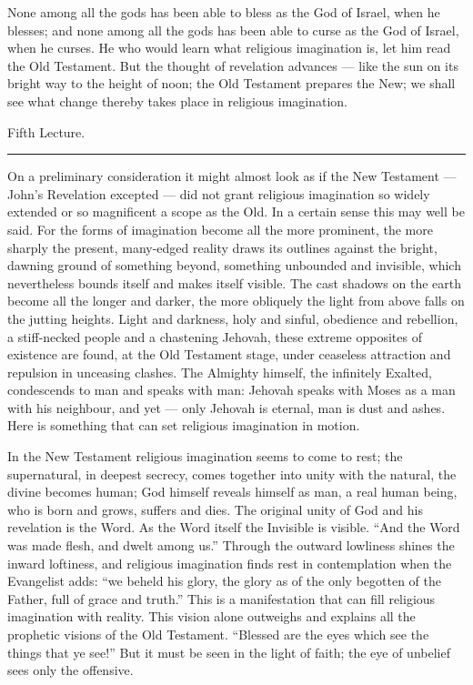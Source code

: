 \documentclass[12pt,a4paper,openany]{book}
\newcommand{\opage}[1]{\marginnote{\footnotesize\textit{[#1]}}}
\newcommand{\lecture}[1]{\clearpage\begin{center}{\large #1}\\[0.4em]\rule{3em}{0.4pt}\end{center}\medskip\noindent}
\begin{document}
None among all the gods has been able to bless as the God of Israel, when he blesses; and none among all the gods has been able to curse as the God of Israel, when he curses. He who would learn what religious imagination is, let him read the Old Testament. But the thought of revelation advances --- like the sun on its bright way to the height of noon; the Old Testament prepares the New; we shall see what change thereby takes place in religious imagination.

\setcounter{footnote}{0}%
\lecture{Fifth Lecture.}\opage{57}

On a preliminary consideration it might almost look
as if the New Testament --- John's Revelation excepted
--- did not grant religious imagination
so widely extended or so magnificent a scope as the
Old. In a certain sense this may well be said.
For the forms of imagination become all the more prominent,
the more sharply the present, many-edged reality
draws its outlines against the bright, dawning ground of
something beyond, something unbounded and invisible, which nevertheless bounds
itself and makes itself visible. The cast shadows on
the earth become all the longer and darker, the more obliquely
the light from above falls on the jutting heights.
Light and darkness, holy and sinful, obedience and rebellion,
a stiff-necked people and a chastening Jehovah, these
extreme opposites of existence are found, at the
Old Testament stage, under ceaseless attraction
and repulsion in unceasing clashes. The Almighty
himself, the infinitely Exalted, condescends to man
and speaks with man: Jehovah speaks with Moses as
a man with his neighbour, and yet --- only Jehovah is
eternal, man is dust and ashes. Here is something that
can set religious imagination in motion.

\setcounter{footnote}{0}%
\opage{58}In the New Testament religious imagination seems
to come to rest; the supernatural, in deepest
secrecy, comes together into unity with the natural,
the divine becomes human; God himself
reveals himself as man, a real human being,
who is born and grows, suffers and dies. The original
unity of God and his revelation is the Word. As
the Word itself the Invisible is visible. ``And the Word was made
flesh, and dwelt among us.'' Through the outward
lowliness shines the inward loftiness, and religious
imagination finds rest in contemplation when the Evangelist
adds: ``we beheld his glory, the glory as of the
only begotten of the Father, full of grace and truth.''
This is a manifestation that can fill religious
imagination with reality. This vision alone outweighs
and explains all the prophetic visions of the Old Testament.
``Blessed are the eyes which see the things that ye see!'' But it
must be seen in the light of faith; the eye of unbelief sees only the
offensive.
\end{document}
